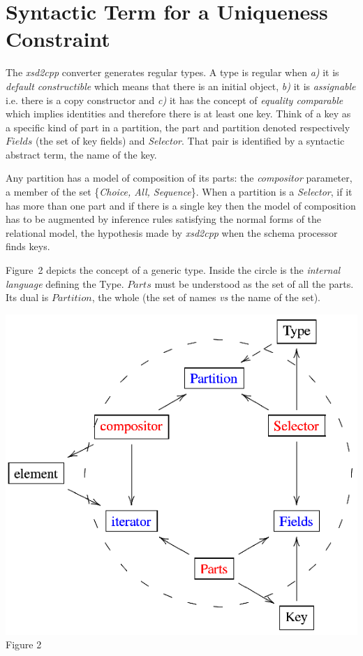\section{Syntactic Term for a Uniqueness Constraint} 
The {\it xsd2cpp} converter generates regular types. A type is regular when
{\it a)} it is  {\it default constructible} which means that there is an initial object,
{\it b)} it is {\it assignable} i.e. there is a copy constructor and 
{\it c)} it has the concept of  {\it equality comparable} which implies identities and therefore
there is at least one key. Think of a  key as a specific kind of part in a partition, the 
part and partition denoted respectively $Fields$ (the set of key fields) and \textit{Selector}. That pair is 
identified by a syntactic abstract term, the name of the key.
\noindent
\begin{minipage}[h]{5.2cm}
\indent
Any partition has a model of composition of its parts: the {\it compositor} 
parameter, a member of the set \{\textit{Choice, All, Sequence}\}. When a partition is
a \textit{Selector}, if it has more than one part and if there is a single key then
the model of composition has to be augmented by inference rules satisfying the normal 
forms of the relational model, the hypothesis made by  {\it xsd2cpp} when the 
schema processor finds keys.

Figure~2 depicts the concept of a generic type.
Inside the circle is the {\it internal language} defining the Type.
$Parts$ must be understood as the set of all the parts. Its dual is 
$Partition$, the whole (the set of names {\it vs} the name of the set). 

\end{minipage}
\begin{minipage}[h]{8.8cm}
 \begin{center}

  \includegraphics[]{part8/Viallefond_P52/P52_2.eps}
  \\Figure 2

 \end{center}
\end{minipage}
